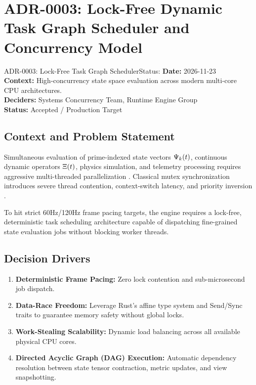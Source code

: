 \section{ADR-0003: Lock-Free Dynamic Task Graph Scheduler and Concurrency Model}
\label{sec:adr0003}

\begin{adrbox}{ADR-0003: Lock-Free Task Graph Scheduler}{Status: }
\textbf{Date:} 2026-11-23 \\
\textbf{Context:} High-concurrency state space evaluation across modern multi-core CPU architectures. \\
\textbf{Deciders:} Systems Concurrency Team, Runtime Engine Group \\
\textbf{Status:} Accepted / Production Target
\end{adrbox}

\subsection{Context and Problem Statement}
Simultaneous evaluation of prime-indexed state vectors $\Psi_k(t)$, continuous dynamic operators $\Xi(t)$, physics simulation, and telemetry processing requires aggressive multi-threaded parallelization \cite{gregory2018game, herlihy2020art}. Classical mutex synchronization introduces severe thread contention, context-switch latency, and priority inversion \cite{herlihy2020art}. 

To hit strict 60Hz/120Hz frame pacing targets, the engine requires a lock-free, deterministic task scheduling architecture capable of dispatching fine-grained state evaluation jobs without blocking worker threads.

\subsection{Decision Drivers}
\begin{enumerate}[label=\bfseries D\arabic*.]
    \item \textbf{Deterministic Frame Pacing:} Zero lock contention and sub-microsecond job dispatch.
    \item \textbf{Data-Race Freedom:} Leverage Rust's affine type system and Send/Sync traits to guarantee memory safety without global locks.
    \item \textbf{Work-Stealing Scalability:} Dynamic load balancing across all available physical CPU cores.
    \item \textbf{Directed Acyclic Graph (DAG) Execution:} Automatic dependency resolution between state tensor contraction, metric updates, and view snapshotting.
\end{enumerate}

